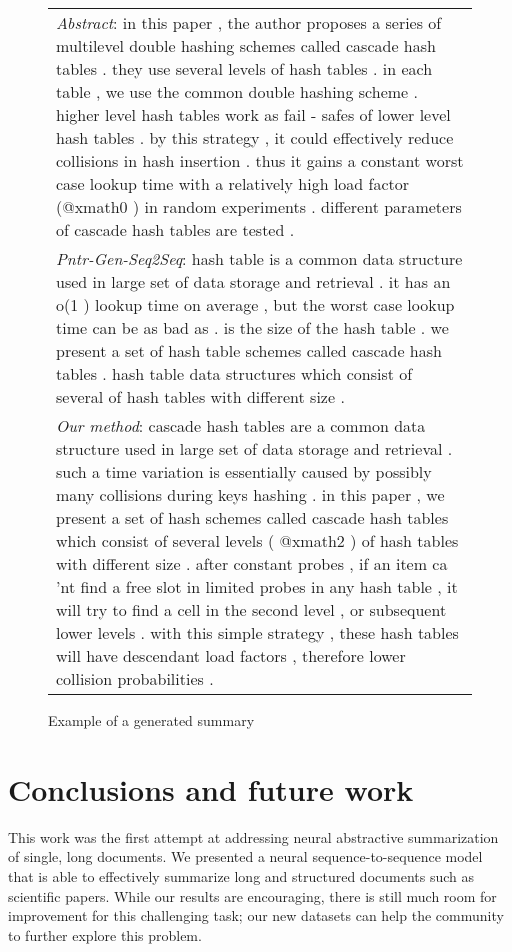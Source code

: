 \documentclass[11pt,a4paper]{article}
\begin{document}
\begin{figure}[]
\centering
\scriptsize
\renewcommand*{\arraystretch}{1.3}
\begin{tabular}{@{}p{\linewidth}@{}}
\toprule
\textit{Abstract}: in this paper , the author proposes a series of multilevel double hashing schemes called cascade hash tables . they use several levels of hash tables . in each table , we use the common double hashing scheme . higher level hash tables work as fail - safes of lower level hash tables . by this strategy , it could effectively reduce collisions in hash insertion . thus it gains a constant worst case lookup time with a relatively high load factor (@xmath0 ) in random experiments . different parameters of cascade hash tables are tested .
\\
\textit{Pntr-Gen-Seq2Seq}: hash table is a common data structure used in large set of data storage and retrieval . it has an o(1 ) lookup time on average , but the worst case lookup time can be as bad as . is the size of the hash table . we present a set of hash table schemes called cascade hash tables . hash table data structures which consist of several of hash tables with different size .
\\
\textit{Our method}: cascade hash tables are a common data structure used in large set of data storage and retrieval . such a time variation is essentially caused by possibly many collisions during keys hashing . in this paper , we present a set of hash schemes called cascade hash tables which consist of several levels ( @xmath2 ) of hash tables with different size . after constant probes , if an item ca 'nt find a free slot in limited probes in any hash table , it will try to find a cell in the second level , or subsequent lower levels . with this simple strategy , these hash tables will have descendant load factors , therefore lower collision probabilities . \\ \bottomrule
\end{tabular}
\caption{Example of a generated summary}
\label{fig:example}
\vspace{-2pt}
\end{figure}

\section{Conclusions and future work}
This work was the first attempt at addressing neural abstractive summarization of single, long documents. We presented a neural sequence-to-sequence model that is able to effectively summarize long and structured documents such as scientific papers. While our results are encouraging, there is still much room for improvement for this challenging task; our new datasets can help the community to further explore this problem.
\end{document}
